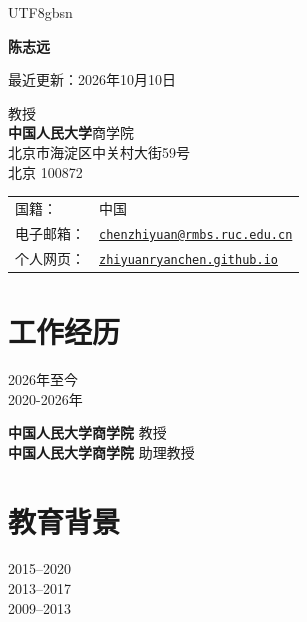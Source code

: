 \documentclass[letterpaper]{article}
\begin{document}
\begin{CJK}{UTF8}{gbsn}

\def\name{陈志远}
\markright{\name}

\centerline{\huge \bf \name}

\vspace{1ex}

\begin{center}
{\scriptsize 最近更新：2026年10月10日}
\end{center}

\vspace{0.2in}

\normalsize

\begin{minipage}{0.55\linewidth}
  教授 \\
  \textbf{中国人民大学}商学院 \\
  北京市海淀区中关村大街59号 \\
  北京 100872
\end{minipage}
\begin{minipage}{0.45\linewidth}
  \begin{tabular}{ll}
    国籍： & 中国 \\
    电子邮箱： & \href{mailto:chenzhiyuan@rmbs.ruc.edu.cn}{\tt chenzhiyuan@rmbs.ruc.edu.cn} \\
    个人网页： & \href{https://zhiyuanryanchen.github.io/}{\tt zhiyuanryanchen.github.io} \\
  \end{tabular}
\end{minipage}

\section*{\textsc{工作经历}}
\begin{minipage}{0.2\textwidth}
2026年至今\\
2020-2026年
\end{minipage}
\begin{minipage}{0.8\textwidth}
  \raggedright
\textbf{中国人民大学商学院} 教授 \\
\textbf{中国人民大学商学院} 助理教授 \\
\end{minipage}

\section*{\textsc{教育背景}}
\begin{minipage}{0.2\textwidth}
    2015--2020 \\
  2013--2017 \\
  2009--2013


\end{minipage}
\end{CJK}
\end{document}
